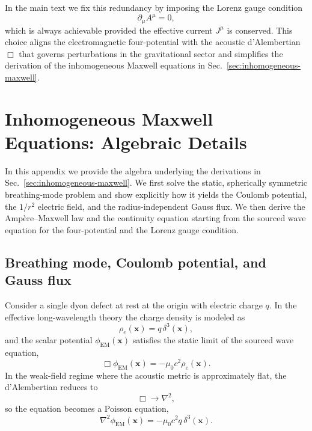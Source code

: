 \documentclass[11pt]{article}
\begin{document}
In the main text we fix this redundancy by imposing the Lorenz gauge condition
\begin{equation}
\partial_\mu A^\mu = 0,
\end{equation}
which is always achievable provided the effective current $J^\mu$ is conserved.  This choice aligns the electromagnetic four-potential with the acoustic d'Alembertian $\Box$ that governs perturbations in the gravitational sector and simplifies the derivation of the inhomogeneous Maxwell equations in Sec.~\ref{sec:inhomogeneous-maxwell}.

\section{Inhomogeneous Maxwell Equations: Algebraic Details}
\label{app:inhomogeneous-details}

In this appendix we provide the algebra underlying the derivations in Sec.~\ref{sec:inhomogeneous-maxwell}.  We first solve the static, spherically symmetric breathing-mode problem and show explicitly how it yields the Coulomb potential, the $1/r^2$ electric field, and the radius-independent Gauss flux.  We then derive the Amp\`ere--Maxwell law and the continuity equation starting from the sourced wave equation for the four-potential and the Lorenz gauge condition.

\subsection{Breathing mode, Coulomb potential, and Gauss flux}
\label{app:breathing-gauss}

Consider a single dyon defect at rest at the origin with electric charge $q$.  In the effective long-wavelength theory the charge density is modeled as
\begin{equation}
\rho_e(\mathbf{x}) = q\,\delta^3(\mathbf{x}),
\end{equation}
and the scalar potential $\phi_{\mathrm{EM}}(\mathbf{x})$ satisfies the static limit of the sourced wave equation,
\begin{equation}
\Box \phi_{\mathrm{EM}}(\mathbf{x}) = -\mu_0 c^2 \rho_e(\mathbf{x}).
\end{equation}
In the weak-field regime where the acoustic metric is approximately flat, the d'Alembertian reduces to
\begin{equation}
\Box \rightarrow \nabla^2,
\end{equation}
so the equation becomes a Poisson equation,
\begin{equation}
\nabla^2 \phi_{\mathrm{EM}}(\mathbf{x})
= -\mu_0 c^2 q\,\delta^3(\mathbf{x}).
\label{eq:app-poisson}
\end{equation}
\end{document}
